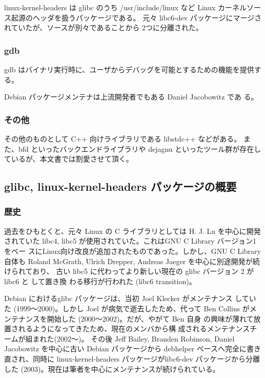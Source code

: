 \documentclass[mingoth,a4paper]{jsarticle}
\begin{document}
    linux-kernel-headers は glibc のうち /usr/include/linux など
    Linux カーネルソース起源のヘッダを扱うパッケージである。
    元々 libc6-dev パッケージにマージされていたが、ソースが別々であることから
    2つに分離された。

  \subsubsection{gdb}

    gdb はバイナリ実行時に、ユーザからデバッグを可能とするための機能を提供する。

    Debian パッケージメンテナは上流開発者でもある Daniel Jacobowitz であ
    る。

  \subsubsection{その他}

    その他のものとして C++ 向けライブラリである libstdc++ などがある。
    また、bfd といったバックエンドライブラリや dejagnu といったツール群が存在し
    ているが、本文書では割愛させて頂く。

\subsection{glibc, linux-kernel-headers パッケージの概要}

  \subsubsection{歴史}

    過去をひもとくと、元々 Linux の C ライブラリとしては H. J. Lu を中心に開発されていた
    libc4, libc5 が使用されていた。これはGNU C Library バージョン1をベー
    スにLinux向け改良が追加されたものであった。しかし、GNU C Library 自体も Roland McGrath, Ulrich
    Drepper, Andreas Jaeger を中心に別途開発が続けられており、
    古い libc5 に代わってより新しい現在の glibc バージョン 2 が libc6 と
    して置き換
    わる移行が行われた (libc6 transition)。

    Debian におけるglibc パッケージは、当初 Joel Klecker がメンテナンス
    していた (1999〜2000)。しかし Joel が病気で逝去したため、代って Ben
    Collins がメンテナンスを開始した (2000〜2002)。だが、やがて Ben 自身
    の興味が薄れて放置されるようになってきたため、現在のメンバから構
    成されるメンテナンスチームが組まれた(2002〜)。
    その後 Jeff Bailey, Branden Robinson, Daniel Jacobowitz を中心に古い 
    Debian パッケージから debhelper ベースへ完全に書き直され、同時に
    linux-kernel-headers パッケージがlibc6-dev パッケージから分離した 
    (2003)。現在は筆者を中心にメンテナンスが続けられている。
\end{document}
